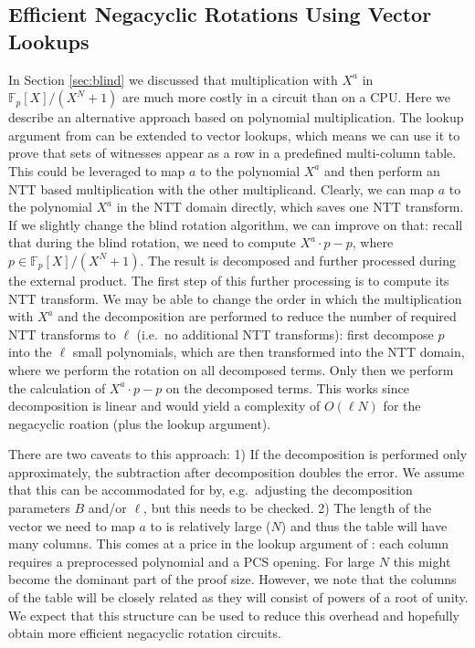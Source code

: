 \documentclass{zamarep}
\newcommand{\field}{\mathbb{F}}
\begin{document}
\subsection{Efficient Negacyclic Rotations Using Vector Lookups}
\label{sec:vector}
In Section \ref{sec:blind} we discussed that multiplication with $X^a$ in $\field_p[X]/(X^N + 1)$ are much more costly in a circuit than on a CPU. Here we describe an alternative approach based on polynomial multiplication. The lookup argument from \cite{halo2} can be extended to vector lookups, which means we can use it to prove that sets of witnesses appear as a row in a predefined multi-column table. This could be leveraged to map $a$ to the polynomial $X^a$ and then perform an NTT based multiplication with the other multiplicand. Clearly, we can map $a$ to the polynomial $X^a$ in the NTT domain directly, which saves one NTT transform. If we slightly change the blind rotation algorithm, we can improve on that: recall that during the blind rotation, we need to compute $X^a \cdot p - p$, where $p \in \field_p[X]/(X^N + 1)$. The result is decomposed and further processed during the external product. The first step of this further processing is to compute its NTT transform. We may be able to change the order in which the multiplication with $X^a$ and the decomposition are performed to reduce the number of required NTT transforms to $\ell$ (i.e.\ no additional NTT transforms): first decompose $p$ into the $\ell$ small polynomials, which are then transformed into the NTT domain, where we perform the rotation on all decomposed terms. Only then we perform the calculation of $X^a \cdot p - p$ on the decomposed terms. This works since decomposition is linear and would yield a complexity of $O(\ell N)$ for the negacyclic roation (plus the lookup argument).

There are two caveats to this approach: 1) If the decomposition is performed only approximately, the subtraction after decomposition doubles the error. We assume that this can be accommodated for by, e.g.\ adjusting the decomposition parameters $B$ and/or $\ell$, but this needs to be checked. 2) The length of the vector we need to map $a$ to is relatively large ($N$) and thus the table will have many columns. This comes at a price in the lookup argument of \cite{halo2}: each column requires a preprocessed polynomial and a PCS opening. For large $N$ this might become the dominant part of the proof size. However, we note that the columns of the table will be closely related as they will consist of powers of a root of unity. We expect that this structure can be used to reduce this overhead and hopefully obtain more efficient negacyclic rotation circuits.
\end{document}
